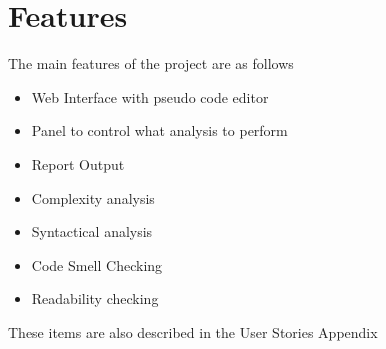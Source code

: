 \section{Features}
The main features of the project are as follows
\begin{itemize}
    \item Web Interface with pseudo code editor
    \item Panel to control what analysis to perform
    \item Report Output
    \item Complexity analysis
    \item Syntactical analysis
    \item Code Smell Checking
    \item Readability checking
\end{itemize}

These items are also described in the User Stories Appendix


